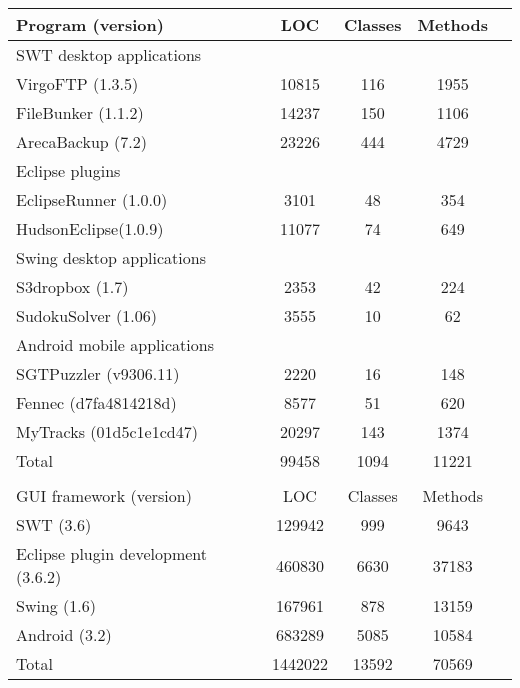 \begin{table}[t]
\begin{center}
 \fontsize{9pt}{\baselineskip}\selectfont
\hspace*{-0.2cm}
\setlength{\tabcolsep}{.6\tabcolsep}
\begin{tabular}{|p{4.4cm}||c|c|c|c|}
\hline
 Program (version) & LOC & Classes & Methods \\
\hline \hline
\multicolumn{4}{|l|}{SWT desktop applications}   \\
 \hline
 VirgoFTP (1.3.5) &  10815 &  116 &  1955\\
 \hline
 FileBunker (1.1.2)&  14237 &  150 &  1106  \\
 \hline
 ArecaBackup (7.2)&   23226 &  444 &  4729 \\
 \hline
 \hline
\multicolumn{4}{|l|}{Eclipse plugins}   \\
 \hline
 EclipseRunner (1.0.0) &  3101 &  48 &  354\\
 \hline
 HudsonEclipse(1.0.9)&  11077 &  74 &  649 \\
 \hline
 \hline
\multicolumn{4}{|l|}{Swing desktop applications}   \\
 \hline
 S3dropbox (1.7) &  2353 &  42  &  224 \\
 \hline
 SudokuSolver (1.06)&  3555 &  10 &  62 \\
 \hline
 \hline
\multicolumn{4}{|l|}{Android mobile applications}   \\
 \hline
 SGTPuzzler (v9306.11)&  2220 &  16 &  148 \\
 \hline
 Fennec (d7fa4814218d)&  8577 &  51 &  620 \\
 \hline
 MyTracks (01d5c1e1cd47)&  20297 &  143 &  1374 \\
\hline
\hline
 Total &  99458 &  1094 &  11221 \\
\hline
\multicolumn{4}{l}{}   \\
\hline
 GUI framework (version) & LOC & Classes & Methods  \\
\hline \hline
 SWT (3.6)&  129942 &  999 &  9643 \\
\hline
 Eclipse plugin development (3.6.2)&  460830 &  6630 &  37183 \\
\hline
Swing (1.6)&  167961 &  878 &  13159 \\
\hline
 Android (3.2)&  683289 &  5085 &  10584 \\
\hline
\hline
 Total &  1442022 &  13592 &  70569\\
\hline
\end{tabular}

\end{center}
\vspace{-15pt}
\end{table}

